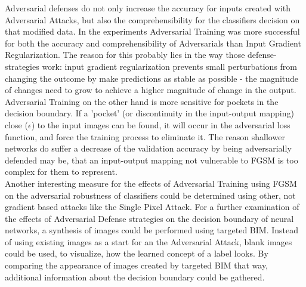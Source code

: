 \documentclass[draft,final]{vutinfth} %
\begin{document}
Adversarial defenses do not only increase the accuracy for inputs created with Adversarial Attacks, but also the comprehensibility for the classifiers decision on that modified data. 
In the experiments Adversarial Training was more successful for both the accuracy and comprehensibility of Adversarials than Input Gradient Regularization.
The reason for this probably lies in the way those defense-strategies work: input gradient regularization prevents small perturbations from changing the outcome by make predictions as stable as possible - the magnitude of changes need to grow to achieve a higher magnitude of change in the output.
Adversarial Training on the other hand is more sensitive for pockets in the decision boundary.
If a 'pocket' (or discontinuity in the input-output mapping) close ($\epsilon$) to the input images can be found, it will occur in the adversarial loss function, and force the training process to eliminate it.
The reason shallower networks do suffer a decrease of the validation accuracy by being adversarially defended may be, that an input-output mapping not vulnerable to FGSM is too complex for them to represent.
\\
Another interesting measure for the effects of Adversarial Training using FGSM on the adversarial robustness of classifiers could be determined using other, not gradient based attacks like the Single Pixel Attack.
For a further examination of the effects of Adversarial Defense strategies on the decision boundary of neural networks, a synthesis of images could be performed using targeted BIM.
Instead of using existing images as a start for an the Adversarial Attack, blank images could be used, to visualize, how the learned concept of a label looks.
By comparing the appearance of images created by targeted BIM that way, additional information about the decision boundary could be gathered.

\backmatter

\listoffigures %



\printindex

\printglossaries



\end{document}
